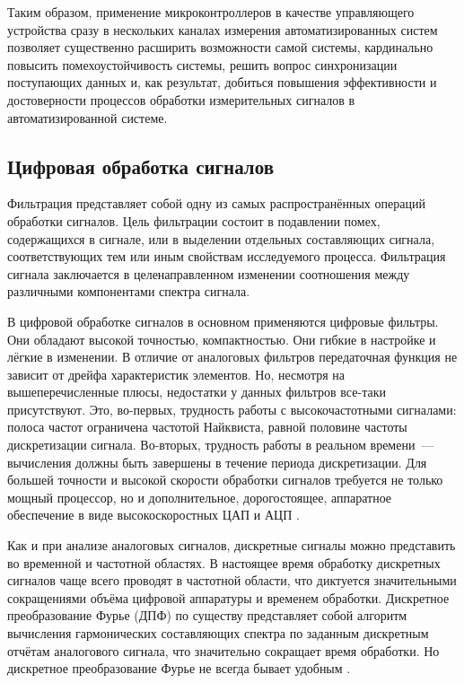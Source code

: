 \documentclass[a4paper, 14pt, titlepage]{extarticle}
\begin{document}
  Таким образом, применение микроконтроллеров в качестве управляющего устройства сразу в нескольких
  каналах измерения автоматизированных систем позволяет существенно расширить возможности самой
  системы, кардинально повысить помехоустойчивость системы, решить вопрос синхронизации поступающих
  данных и, как результат, добиться повышения эффективности и достоверности процессов обработки
  измерительных сигналов в автоматизированной системе.

  \subsection{Цифровая обработка сигналов}

  Фильтрация представляет собой одну из самых распространённых операций обработки сигналов. Цель
  фильтрации состоит в подавлении помех, содержащихся в сигнале, или в выделении отдельных
  составляющих сигнала, соответствующих тем или иным свойствам исследуемого процесса. Фильтрация
  сигнала заключается в целенаправленном изменении соотношения между различными компонентами спектра
  сигнала.

  В цифровой обработке сигналов в основном применяются цифровые фильтры. Они обладают высокой
  точностью, компактностью. Они гибкие в настройке и лёгкие в изменении. В отличие от аналоговых
  фильтров передаточная функция не зависит от дрейфа характеристик элементов. Но, несмотря на
  вышеперечисленные плюсы, недостатки у данных фильтров все-таки присутствуют. Это, во-первых, трудность работы с
  высокочастотными сигналами: полоса частот ограничена частотой Найквиста, равной половине частоты
  дискретизации сигнала. Во-вторых, трудность работы в реальном времени~--- вычисления должны быть завершены в
  течение периода дискретизации. Для большей точности и высокой скорости обработки сигналов
  требуется не только мощный процессор, но и дополнительное, дорогостоящее, аппаратное обеспечение в
  виде высокоскоростных ЦАП и АЦП \cite{glinchenko-digital}.

  Как и при анализе аналоговых сигналов, дискретные сигналы можно представить во временной и
  частотной областях. В настоящее время обработку дискретных сигналов чаще всего проводят в
  частотной области, что диктуется значительными сокращениями объёма цифровой аппаратуры и временем
  обработки. Дискретное преобразование Фурье (ДПФ) по существу представляет собой алгоритм вычисления
  гармонических составляющих спектра по заданным дискретным отчётам аналогового сигнала, что
  значительно сокращает время обработки.  Но дискретное преобразование Фурье не всегда бывает
  удобным \cite{solonina-algorithms}.
\end{document}
